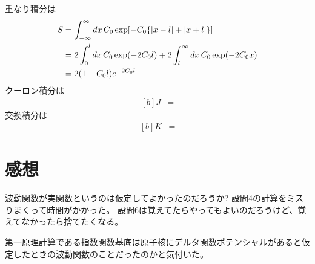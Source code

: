 \documentclass[../../master.tex]{subfiles}
\begin{document}
\section{}
重なり積分は
\begin{equation}\begin{aligned}[b]
    S &= \int_{-\infty}^\infty dx\,C_0\exp[-C_0\qty{\abs{x-l}+\abs{x+l}}]\\
    &= 2\int_0^l dx\,C_0 \exp(-2C_0l) + 2 \int_l^{\infty}dx\,C_0\exp(-2C_0x)\\
    &= 2(1+C_0l)e^{-2C_0l}
\end{aligned}\end{equation}
クーロン積分は
\begin{equation}\begin{aligned}[b]
    J &=
\end{aligned}\end{equation}
交換積分は
\begin{equation}\begin{aligned}[b]
    K &=
\end{aligned}\end{equation}

\section*{感想}
波動関数が実関数というのは仮定してよかったのだろうか?
設問4の計算をミスりまくって時間がかかった。
設問6は覚えてたらやってもよいのだろうけど、覚えてなかったら捨てたくなる。

第一原理計算である指数関数基底は原子核にデルタ関数ポテンシャルがあると仮定したときの波動関数のことだったのかと気付いた。
\end{document}
